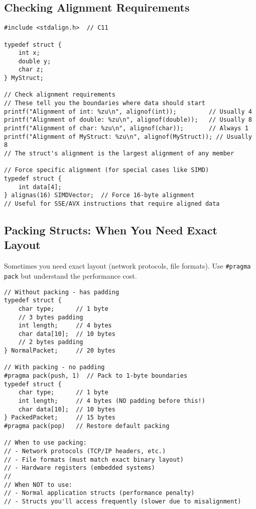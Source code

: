 \subsection{Checking Alignment Requirements}

\begin{lstlisting}
#include <stdalign.h>  // C11

typedef struct {
    int x;
    double y;
    char z;
} MyStruct;

// Check alignment requirements
// These tell you the boundaries where data should start
printf("Alignment of int: %zu\n", alignof(int));         // Usually 4
printf("Alignment of double: %zu\n", alignof(double));   // Usually 8
printf("Alignment of char: %zu\n", alignof(char));       // Always 1
printf("Alignment of MyStruct: %zu\n", alignof(MyStruct)); // Usually 8
// The struct's alignment is the largest alignment of any member

// Force specific alignment (for special cases like SIMD)
typedef struct {
    int data[4];
} alignas(16) SIMDVector;  // Force 16-byte alignment
// Useful for SSE/AVX instructions that require aligned data
\end{lstlisting}

\subsection{Packing Structs: When You Need Exact Layout}

Sometimes you need exact layout (network protocols, file formats). Use \texttt{\#pragma pack} but understand the performance cost.

\begin{lstlisting}
// Without packing - has padding
typedef struct {
    char type;      // 1 byte
    // 3 bytes padding
    int length;     // 4 bytes
    char data[10];  // 10 bytes
    // 2 bytes padding
} NormalPacket;     // 20 bytes

// With packing - no padding
#pragma pack(push, 1)  // Pack to 1-byte boundaries
typedef struct {
    char type;      // 1 byte
    int length;     // 4 bytes (NO padding before this!)
    char data[10];  // 10 bytes
} PackedPacket;     // 15 bytes
#pragma pack(pop)   // Restore default packing

// When to use packing:
// - Network protocols (TCP/IP headers, etc.)
// - File formats (must match exact binary layout)
// - Hardware registers (embedded systems)
//
// When NOT to use:
// - Normal application structs (performance penalty)
// - Structs you'll access frequently (slower due to misalignment)
\end{lstlisting}

